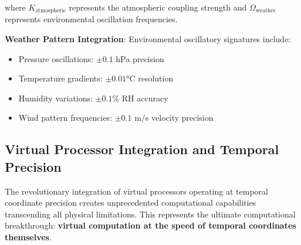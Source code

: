 \documentclass[12pt,a4paper]{article}
\begin{document}
where $K_{\text{atmospheric}}$ represents the atmospheric coupling strength and $\Omega_{\text{weather}}$ represents environmental oscillation frequencies.

\textbf{Weather Pattern Integration}: Environmental oscillatory signatures include:
\begin{itemize}
\item Pressure oscillations: $\pm 0.1$ hPa precision
\item Temperature gradients: $\pm 0.01$°C resolution
\item Humidity variations: $\pm 0.1$\% RH accuracy
\item Wind pattern frequencies: $\pm 0.1$ m/s velocity precision
\end{itemize}

\subsection{Virtual Processor Integration and Temporal Precision}

The revolutionary integration of virtual processors operating at temporal coordinate precision creates unprecedented computational capabilities transcending all physical limitations. This represents the ultimate computational breakthrough: \textbf{virtual computation at the speed of temporal coordinates themselves}.
\end{document}
